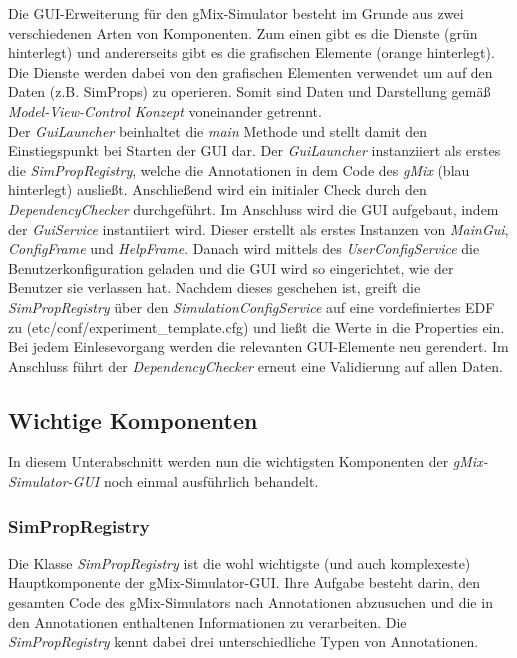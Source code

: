 \documentclass[a4paper, 11pt]{article} %
\begin{document}
Die GUI-Erweiterung für den gMix-Simulator besteht im Grunde aus zwei verschiedenen Arten von Komponenten. Zum einen gibt es die Dienste (grün hinterlegt) und andererseits gibt es die grafischen Elemente (orange hinterlegt). Die Dienste werden dabei von den grafischen Elementen verwendet um auf den Daten (z.B. SimProps) zu operieren. Somit sind Daten und Darstellung gemäß \emph{Model-View-Control Konzept} voneinander getrennt.\\

Der \emph{GuiLauncher} beinhaltet die \emph{main} Methode und stellt damit den Einstiegspunkt bei Starten der GUI dar. Der \emph{GuiLauncher} instanziiert als erstes die \emph{SimPropRegistry}, welche die Annotationen in dem Code des \emph{gMix} (blau hinterlegt) ausließt. Anschließend wird ein initialer Check durch den \emph{DependencyChecker} durchgeführt. Im Anschluss wird die GUI aufgebaut, indem der \emph{GuiService} instantiiert wird. Dieser erstellt als erstes Instanzen von \emph{MainGui}, \emph{ConfigFrame} und \emph{HelpFrame}. Danach wird mittels des \emph{UserConfigService} die Benutzerkonfiguration geladen und die GUI wird so eingerichtet, wie der Benutzer sie verlassen hat. Nachdem dieses geschehen ist, greift die \emph{SimPropRegistry} über den \emph{SimulationConfigService} auf eine vordefiniertes EDF zu (etc/conf/experiment\_template.cfg) und ließt die Werte in die Properties ein. Bei jedem Einlesevorgang werden die relevanten GUI-Elemente neu gerendert. Im Anschluss führt der \emph{DependencyChecker} erneut eine Validierung auf allen Daten.


\subsection{Wichtige Komponenten} %
\label{ssub:einzelne_komponenten}
In diesem Unterabschnitt werden nun die wichtigsten Komponenten der \emph{gMix-Simulator-GUI} noch einmal ausführlich behandelt.

\subsubsection{SimPropRegistry}
\label{sssub:simpropregistry}
Die Klasse \emph{SimPropRegistry} ist die wohl wichtigste (und auch komplexeste) Hauptkomponente der gMix-Simulator-GUI. Ihre Aufgabe besteht darin, den gesamten Code des gMix-Simulators nach Annotationen abzusuchen und die in den Annotationen enthaltenen Informationen zu verarbeiten. Die \emph{SimPropRegistry} kennt dabei drei unterschiedliche Typen von Annotationen.
\end{document}
